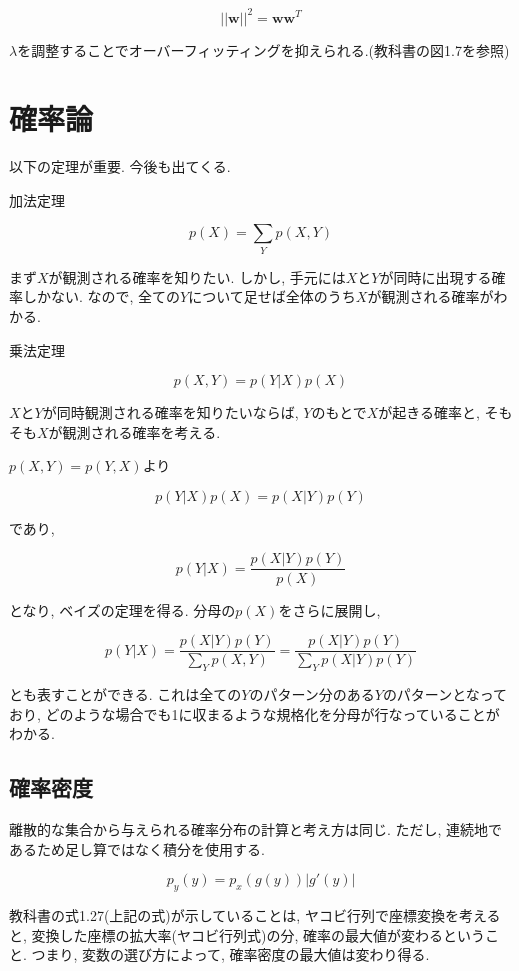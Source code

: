 $$ ||\bm{w}||^2 = \bm{w}\bm{w}^T $$

$\lambda$を調整することでオーバーフィッティングを抑えられる.(教科書の図1.7を参照)

\section{確率論}

以下の定理が重要. 今後も出てくる.

加法定理

$$ p(X) = \sum_{Y} p(X, Y) $$

まず$X$が観測される確率を知りたい. しかし, 手元には$X$と$Y$が同時に出現する確率しかない. なので, 全ての$Y$について足せば全体のうち$X$が観測される確率がわかる.

乗法定理

$$ p(X, Y) = p(Y|X)p(X) $$

$X$と$Y$が同時観測される確率を知りたいならば, $Y$のもとで$X$が起きる確率と, そもそも$X$が観測される確率を考える.

$p(X, Y) = p(Y, X)$より

$$ p(Y|X)p(X) = p(X|Y)p(Y) $$

であり,

$$ p(Y|X) = \frac{p(X|Y)p(Y)}{p(X)} $$

となり, ベイズの定理を得る. 
分母の$p(X)$をさらに展開し,

$$ p(Y|X) = \frac{p(X|Y)p(Y)}{\sum_{Y} p(X, Y)} = \frac{p(X|Y)p(Y)}{\sum_{Y} p(X|Y)p(Y)} $$

とも表すことができる. これは全ての$Y$のパターン分のある$Y$のパターンとなっており, どのような場合でも1に収まるような規格化を分母が行なっていることがわかる.

\subsection{確率密度}

離散的な集合から与えられる確率分布の計算と考え方は同じ. ただし, 連続地であるため足し算ではなく積分を使用する.

$$ p_y(y) = p_x(g(y))|g'(y)| $$

教科書の式1.27(上記の式)が示していることは, ヤコビ行列で座標変換を考えると, 変換した座標の拡大率(ヤコビ行列式)の分, 確率の最大値が変わるということ. つまり, 変数の選び方によって, 確率密度の最大値は変わり得る.



